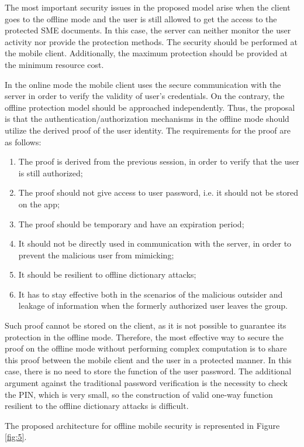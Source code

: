 \documentclass[twocolumn]{svjour3}          	%
\begin{document}
The most important security issues in the proposed model arise when the client goes to the offline mode and the user is still allowed to get the access to the protected SME documents. In this case, the server can neither monitor the user activity nor provide the protection methods. The security should be performed at the mobile client. Additionally, the maximum protection should be provided at the minimum resource cost. 

In the online mode the mobile client uses the secure communication with the server in order to verify the validity of user’s credentials. On the contrary, the offline protection model should be approached independently. Thus, the proposal is that the authentication/authorization mechanisms in the offline mode should utilize the derived proof of the user identity. The requirements for the proof are as follows:

\begin{enumerate}
	\item The proof is derived from the previous session, in order to verify that the user is still authorized;
	\item The proof should not give access to user password, i.e. it should not be stored on the app;
	\item The proof should be temporary and have an expiration period;
	\item It should not be directly used in communication with the server, in order to prevent the malicious user from mimicking;
	\item It should be resilient to offline dictionary attacks;
	\item It has to stay effective both in the scenarios of the malicious outsider and leakage of information when the formerly authorized user leaves the group.
\end{enumerate}

Such proof cannot be stored on the client, as it is not possible to guarantee its protection in the offline mode. Therefore, the most effective way to secure the proof on the offline mode without performing complex computation is to share this proof between the mobile client and the user in a protected manner. In this case, there is no need to store the function of the user password. The additional argument against the traditional password verification is the necessity to check the PIN, which is very small, so the construction of valid one-way function resilient to the offline dictionary attacks is difficult.

The proposed architecture for offline mobile security is represented in Figure \ref{fig:5}.
\end{document}

